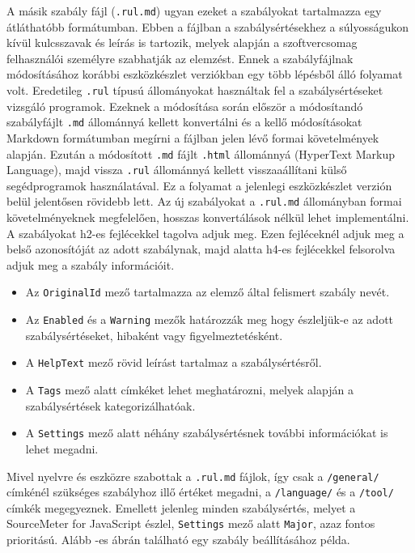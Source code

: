 A másik szabály fájl (\texttt{.rul.md}) ugyan ezeket a szabályokat tartalmazza egy átláthatóbb formátumban. Ebben a fájlban a szabálysértésekhez a súlyosságukon kívül kulcsszavak és leírás is tartozik, melyek alapján a szoftvercsomag felhasználói személyre szabhatják az elemzést.
Ennek a szabályfájlnak módosításához korábbi eszközkészlet verziókban egy több lépésből álló folyamat volt. Eredetileg \texttt{.rul} típusú állományokat használtak fel a szabálysértéseket vizsgáló programok. Ezeknek a módosítása során először a módosítandó szabályfájlt \texttt{.md} állománnyá kellett konvertálni és a kellő módosításokat Markdown formátumban megírni a fájlban jelen lévő formai követelmények alapján. Ezután a módosított \texttt{.md} fájlt \texttt{.html} állománnyá (HyperText Markup Language), majd vissza \texttt{.rul} állománnyá kellett visszaaállítani külső segédprogramok használatával.
Ez a folyamat a jelenlegi eszközkészlet verzión belül jelentősen rövidebb lett. Az új szabályokat a \texttt{.rul.md} állományban formai követelményeknek megfelelően, hosszas konvertálások nélkül lehet implementálni. A szabályokat h2-es fejlécekkel tagolva adjuk meg. Ezen fejléceknél adjuk meg a belső azonosítóját az adott szabálynak, majd alatta h4-es fejlécekkel felsorolva adjuk meg a szabály információit. 

\begin{itemize}
    \item Az \texttt{OriginalId} mező tartalmazza az elemző által felismert szabály nevét.
    \item Az \texttt{Enabled} és a \texttt{Warning} mezők határozzák meg hogy észleljük-e az adott szabálysértéseket, hibaként vagy figyelmeztetésként.
    \item A \texttt{HelpText} mező rövid leírást tartalmaz a szabálysértésről. 
    \item A \texttt{Tags} mező alatt címkéket lehet meghatározni, melyek alapján a szabálysértések kategorizálhatóak.
    \item A \texttt{Settings} mező alatt néhány szabálysértésnek további információkat is lehet megadni. 
\end{itemize}
 Mivel nyelvre és eszközre szabottak a \texttt{.rul.md} fájlok, így csak a \texttt{/general/} címkénél szükséges szabályhoz illő értéket megadni, a \texttt{/language/} és a \texttt{/tool/} címkék megegyeznek. Emellett jelenleg minden szabálysértés, melyet a SourceMeter for JavaScript észlel, \texttt{Settings} mező alatt \texttt{Major}, azaz fontos prioritású. Alább -es ábrán található egy szabály beállításához példa.


